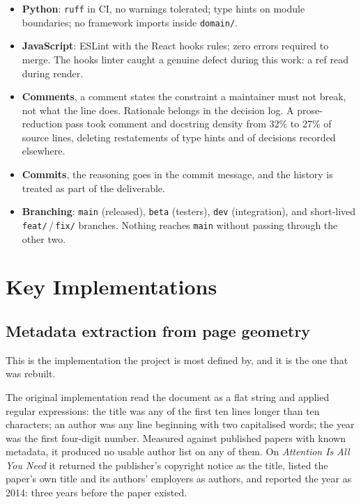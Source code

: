 \documentclass[12pt,a4paper]{report}
\begin{document}
\begin{itemize}[leftmargin=*]
  \item \textbf{Python}: \texttt{ruff} in CI, no warnings tolerated;
        type hints on module boundaries; no framework imports inside
        \texttt{domain/}.
  \item \textbf{JavaScript}: ESLint with the React hooks rules; zero errors
        required to merge. The hooks linter caught a genuine defect during this
        work: a ref read during render.
  \item \textbf{Comments}, a comment states the constraint a maintainer must
        not break, not what the line does. Rationale belongs in the decision
        log. A prose-reduction pass took comment and docstring density from
        32\% to 27\% of source lines, deleting restatements of type hints and
        of decisions recorded elsewhere.
  \item \textbf{Commits}, the reasoning goes in the commit message, and the
        history is treated as part of the deliverable.
  \item \textbf{Branching}: \texttt{main} (released), \texttt{beta}
        (testers), \texttt{dev} (integration), and short-lived
        \texttt{feat/}\,/\,\texttt{fix/} branches. Nothing reaches
        \texttt{main} without passing through the other two.
\end{itemize}

\section{Key Implementations}

\subsection{Metadata extraction from page geometry}

This is the implementation the project is most defined by, and it is the one
that was rebuilt.

The original implementation read the document as a flat string and applied
regular expressions: the title was any of the first ten lines longer than ten
characters; an author was any line beginning with two capitalised words; the
year was the first four-digit number. Measured against published papers with
known metadata, it produced no usable author list on any of them. On
\emph{Attention Is All You Need} it returned the publisher's copyright notice as
the title, listed the paper's own title and its authors' employers as authors,
and reported the year as 2014: three years before the paper existed.
\end{document}
